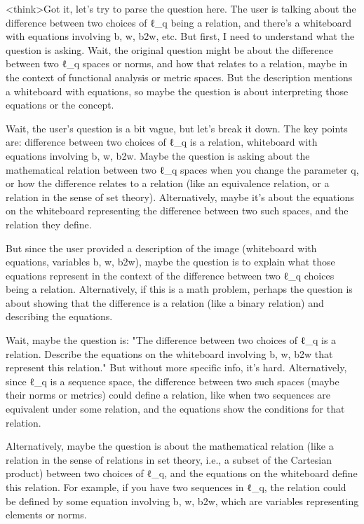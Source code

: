 <think>Got it, let's try to parse the question here. The user is talking about the difference between two choices of ℓ_q being a relation, and there's a whiteboard with equations involving b, w, b2w, etc. But first, I need to understand what the question is asking. Wait, the original question might be about the difference between two ℓ_q spaces or norms, and how that relates to a relation, maybe in the context of functional analysis or metric spaces. But the description mentions a whiteboard with equations, so maybe the question is about interpreting those equations or the concept.

Wait, the user's question is a bit vague, but let's break it down. The key points are: difference between two choices of ℓ_q is a relation, whiteboard with equations involving b, w, b2w. Maybe the question is asking about the mathematical relation between two ℓ_q spaces when you change the parameter q, or how the difference relates to a relation (like an equivalence relation, or a relation in the sense of set theory). Alternatively, maybe it's about the equations on the whiteboard representing the difference between two such spaces, and the relation they define.

But since the user provided a description of the image (whiteboard with equations, variables b, w, b2w), maybe the question is to explain what those equations represent in the context of the difference between two ℓ_q choices being a relation. Alternatively, if this is a math problem, perhaps the question is about showing that the difference is a relation (like a binary relation) and describing the equations.

Wait, maybe the question is: "The difference between two choices of ℓ_q is a relation. Describe the equations on the whiteboard involving b, w, b2w that represent this relation." But without more specific info, it's hard. Alternatively, since ℓ_q is a sequence space, the difference between two such spaces (maybe their norms or metrics) could define a relation, like when two sequences are equivalent under some relation, and the equations show the conditions for that relation.

Alternatively, maybe the question is about the mathematical relation (like a relation in the sense of relations in set theory, i.e., a subset of the Cartesian product) between two choices of ℓ_q, and the equations on the whiteboard define this relation. For example, if you have two sequences in ℓ_q, the relation could be defined by some equation involving b, w, b2w, which are variables representing elements or norms.

